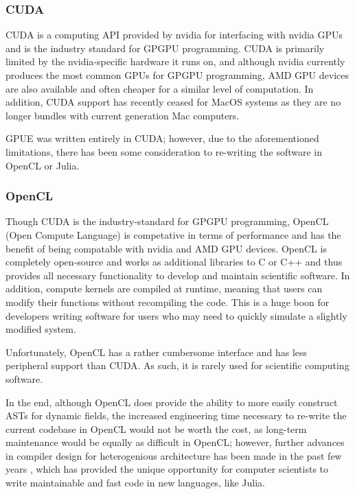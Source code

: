 \subsubsection{CUDA}
CUDA is a computing API provided by nvidia for interfacing with nvidia GPUs and is the industry standard for GPGPU programming.
CUDA is primarily limited by the nvidia-specific hardware it runs on, and although nvidia currently produces the most common GPUs for GPGPU programming, AMD GPU devices are also available and often cheaper for a similar level of computation.
In addition, CUDA support has recently ceased for MacOS systems as they are no longer bundles with current generation Mac computers.

GPUE was written entirely in CUDA; however, due to the aforementioned limitations, there has been some consideration to re-writing the software in OpenCL or Julia.

\subsubsection{OpenCL}

Though CUDA is the industry-standard for GPGPU programming, OpenCL (Open Compute Language) is competative in terms of performance and has the benefit of being compatable with nvidia and AMD GPU devices.
OpenCL is completely open-source and works as additional libraries to C or C++ and thus provides all necessary functionality to develop and maintain scientific software.
In addition, compute kernels are compiled at runtime, meaning that users can modify their functions without recompiling the code.
This is a huge boon for developers writing software for users who may need to quickly simulate a slightly modified system.

Unfortunately, OpenCL has a rather cumbersome interface and has less peripheral support than CUDA.
As such, it is rarely used for scientific computing software.

In the end, although OpenCL does provide the ability to more easily construct ASTs for dynamic fields, the increased engineering time necessary to re-write the current codebase in OpenCL would not be worth the cost, as long-term maintenance would be equally as difficult in  OpenCL; however, further advances in compiler design for heterogenious architecture has been made in the past few years \cite{besard2019}, which has provided the unique opportunity for computer scientists to write maintainable and fast code in new languages, like Julia.

